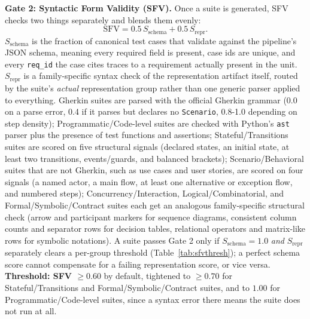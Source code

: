 \documentclass[conference]{IEEEtran}
\begin{document}
  \textbf{Gate 2: Syntactic Form Validity (SFV).} Once a suite is generated,
  SFV checks two things separately and blends them evenly:
  \begin{equation}
  \mathrm{SFV} = 0.5\,S_{\text{schema}} + 0.5\,S_{\text{repr}}.
  \end{equation}
  $S_{\text{schema}}$ is the fraction of canonical test cases that validate
  against the pipeline's JSON schema, meaning every required field is
  present, case ids are unique, and every \texttt{req\_id} the case cites
  traces to a requirement actually present in the unit. $S_{\text{repr}}$ is
  a family-specific syntax check of the representation artifact itself,
  routed by the suite's \emph{actual} representation group rather than one
  generic parser applied to everything. Gherkin suites are parsed with the
  official Gherkin grammar (0.0 on a parse error, 0.4 if it parses but
  declares no \texttt{Scenario}, 0.8-1.0 depending on step density);
  Programmatic/Code-level suites are checked with Python's \texttt{ast}
  parser plus the presence of test functions and assertions;
  Stateful/Transitions suites are scored on five structural signals
  (declared states, an initial state, at least two transitions,
  events/guards, and balanced brackets); Scenario/Behavioral suites that are
  not Gherkin, such as use cases and user stories, are scored on four
  signals (a named actor, a main flow, at least one alternative or
  exception flow, and numbered steps); Concurrency/Interaction,
  Logical/Combinatorial, and Formal/Symbolic/Contract suites each get an
  analogous family-specific structural check (arrow and participant markers
  for sequence diagrams, consistent column counts and separator rows for
  decision tables, relational operators and matrix-like rows for symbolic
  notations). A suite passes Gate 2 only if $S_{\text{schema}} = 1.0$
  \emph{and} $S_{\text{repr}}$ separately clears a per-group threshold
  (Table~\ref{tab:sfvthresh}); a perfect schema score cannot compensate for
  a failing representation score, or vice versa. \textbf{Threshold: SFV
  $\geq 0.60$} by default, tightened to $\geq 0.70$ for
  Stateful/Transitions and Formal/Symbolic/Contract suites, and to $1.00$
  for Programmatic/Code-level suites, since a syntax error there means the
  suite does not run at all.
\end{document}
